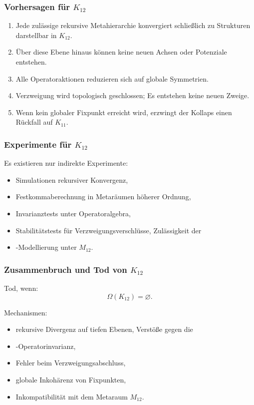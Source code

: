 \subsubsection{Vorhersagen für $K_{12}$}

\begin{enumerate}
    \item Jede zulässige rekursive Metahierarchie konvergiert schließlich zu
          Strukturen darstellbar in $K_{12}$.
    \item Über diese Ebene hinaus können keine neuen Achsen oder Potenziale entstehen.
    \item Alle Operatoraktionen reduzieren sich auf globale Symmetrien.
    \item Verzweigung wird topologisch geschlossen; Es entstehen keine neuen Zweige.
    \item Wenn kein globaler Fixpunkt erreicht wird, erzwingt der Kollaps einen Rückfall auf $K_{11}$.
\end{enumerate}

\subsubsection{Experimente für $K_{12}$}

Es existieren nur indirekte Experimente:
\begin{itemize}
    \item Simulationen rekursiver Konvergenz,
    \item Festkommaberechnung in Metaräumen höherer Ordnung,
    \item Invarianztests unter Operatoralgebra,
    \item Stabilitätstests für Verzweigungsverschlüsse,
    Zulässigkeit der \item-Modellierung unter $M_{12}$.
\end{itemize}

\subsubsection{Zusammenbruch und Tod von $K_{12}$}

Tod, wenn:
\[
\Omega(K_{12})=\varnothing.
\]

Mechanismen:
\begin{itemize}
    \item rekursive Divergenz auf tiefen Ebenen,
    Verstöße gegen die \item-Operatorinvarianz,
    \item Fehler beim Verzweigungsabschluss,
    \item globale Inkohärenz von Fixpunkten,
    \item Inkompatibilität mit dem Metaraum $M_{12}$.
\end{itemize}

